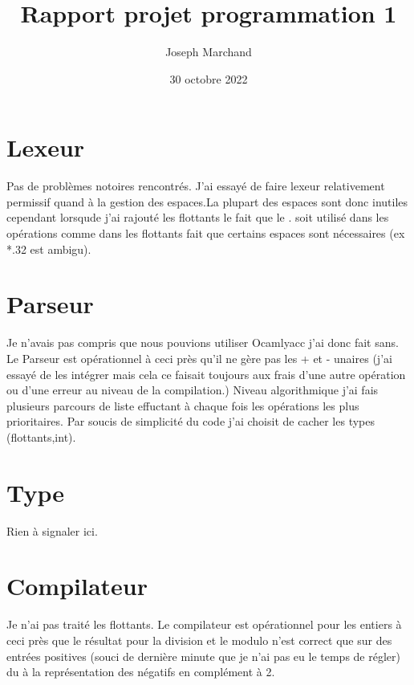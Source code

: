 \documentclass[12pt]{report}
\title{Rapport projet programmation 1}
\author{Joseph Marchand}
\date{30 octobre 2022}
\begin{document}
\maketitle
\section{Lexeur}
Pas de problèmes notoires rencontrés. J'ai essayé de faire lexeur relativement permissif quand à la gestion des espaces.La plupart des espaces sont donc inutiles cependant lorsqude j'ai rajouté les flottants le fait que le . soit utilisé dans les opérations comme dans les flottants fait que certains espaces sont nécessaires (ex *.32 est ambigu).
\section{Parseur}
Je n'avais pas compris que nous pouvions utiliser Ocamlyacc j'ai donc fait sans. Le Parseur est opérationnel à ceci près qu'il ne gère pas les + et - unaires (j'ai essayé de les intégrer mais cela ce faisait toujours aux frais d'une autre opération ou d'une erreur au niveau de la compilation.)
Niveau algorithmique j'ai fais plusieurs parcours de liste effuctant à chaque fois les opérations les plus prioritaires. Par soucis de simplicité du code j'ai choisit de cacher les types (flottants,int).
\section{Type}
Rien à signaler ici.
\section{Compilateur}
Je n'ai pas traité les flottants.
Le compilateur est opérationnel pour les entiers à ceci près que le résultat pour la division et le modulo n'est correct que sur des entrées positives (souci de dernière minute que je n'ai pas eu le temps de régler) du à la représentation des négatifs en complément à 2.
\end{document}
